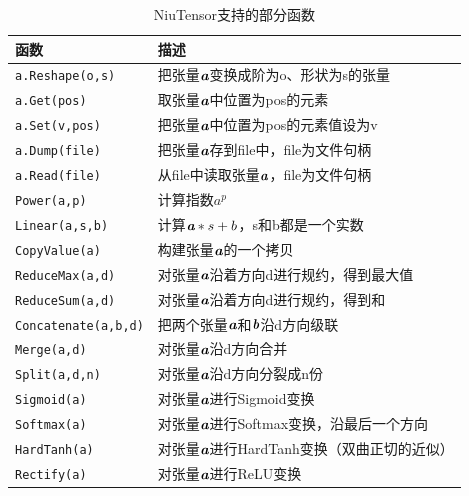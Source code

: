 \begin{table}[htp]
\centering
\caption{NiuTensor支持的部分函数}
\label{tab:9-2}
\small
\begin{tabular}{l | l}
\rule{0pt}{15pt}     函数 & 描述  \\
\hline
\rule{0pt}{15pt}     \texttt{a.Reshape(o,s)} & 把张量$ {\textbf{\em a}} $变换成阶为o、形状为s的张量  \\
\rule{0pt}{15pt}     \texttt{a.Get(pos)} & 取张量$ {\textbf{\em a}} $中位置为pos的元素  \\
\rule{0pt}{15pt}     \texttt{a.Set(v,pos)} & 把张量$ {\textbf{\em a}} $中位置为pos的元素值设为v  \\
\rule{0pt}{15pt}     \texttt{a.Dump(file)} & 把张量$ {\textbf{\em a}} $存到file中，file为文件句柄  \\
\rule{0pt}{15pt}     \texttt{a.Read(file)} & 从file中读取张量$ {\textbf{\em a}} $，file为文件句柄  \\
\rule{0pt}{15pt}     \texttt{Power(a,p)} & 计算指数$ a^p $  \\
\rule{0pt}{15pt}     \texttt{Linear(a,s,b)} & 计算${\textbf{\em a}}\ast s+b $，s和b都是一个实数  \\
\rule{0pt}{15pt}     \texttt{CopyValue(a)} & 构建张量$ {\textbf{\em a}} $的一个拷贝  \\
\rule{0pt}{15pt}     \texttt{ReduceMax(a,d)} & 对张量$ {\textbf{\em a}} $沿着方向d进行规约，得到最大值  \\
\rule{0pt}{15pt}     \texttt{ReduceSum(a,d)} & 对张量$ {\textbf{\em a}} $沿着方向d进行规约，得到和  \\
\rule{0pt}{15pt}     \texttt{Concatenate(a,b,d)} & 把两个张量$ {\textbf{\em a}} $和$ {\textbf{\em b}} $沿d方向级联  \\
\rule{0pt}{15pt}     \texttt{Merge(a,d)} & 对张量$ {\textbf{\em a}} $沿d方向合并  \\
\rule{0pt}{15pt}     \texttt{Split(a,d,n)} & 对张量$ {\textbf{\em a}} $沿d方向分裂成n份  \\
\rule{0pt}{15pt}     \texttt{Sigmoid(a)} & 对张量${\textbf{\em a}}$进行Sigmoid变换  \\
\rule{0pt}{15pt}     \texttt{Softmax(a)} & 对张量$ {\textbf{\em a}} $进行Softmax变换，沿最后一个方向  \\
\rule{0pt}{15pt}     \texttt{HardTanh(a)} & 对张量$ {\textbf{\em a}} $进行HardTanh变换（双曲正切的近似）  \\
\rule{0pt}{15pt}     \texttt{Rectify(a)} & 对张量$ {\textbf{\em a}} $进行ReLU变换  \\
\end{tabular}
\end{table}

